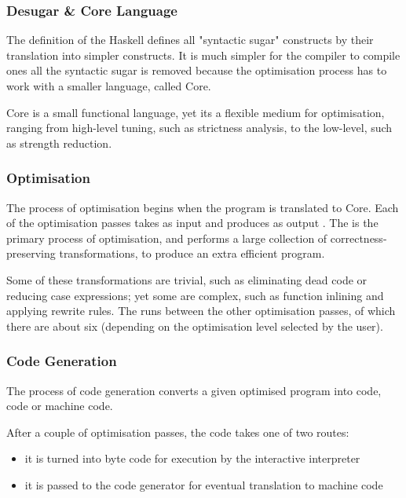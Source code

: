 \subsubsection{Desugar \& Core Language}

The definition of the Haskell defines all "syntactic sugar" constructs by their translation into simpler constructs. It is much simpler for the compiler to compile ones all the syntactic sugar is removed because the optimisation process has to work with a smaller language, called Core.

Core is a small functional language, yet its a flexible medium for optimisation, ranging from high-level tuning, such as strictness analysis, to the low-level, such as strength reduction. \cite{wilson2011architecture}

\subsubsection{Optimisation}

The process of optimisation begins when the program is translated to Core. Each of the optimisation passes takes as input  and produces as output . The is the primary process of optimisation, and performs a large collection of correctness-preserving transformations, to produce an extra efficient program. \cite{wilson2011architecture}

Some of these transformations are trivial, such as eliminating dead code or reducing case expressions; yet some are complex, such as function inlining and applying rewrite rules. The  runs between the other optimisation passes, of which there are about six (depending on the optimisation level selected by the user).

\subsubsection{Code Generation}

\begin{explication}
The process of code generation converts a given optimised  program into  code,  code or machine code. \cite{wilson2011architecture}
\end{explication} 

After a couple of optimisation passes, the code takes one of two routes: 
\begin{itemize}
    \item it is turned into byte code for execution by the interactive interpreter
    \item it is passed to the code generator for eventual translation to machine code
\end{itemize}

